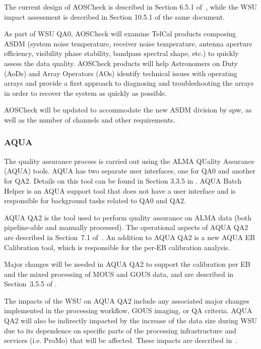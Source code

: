 The current design of AOSCheck is described in Section 6.5.1 of~\cite{CSA-IA}, while the WSU impact assessment is described in Section 10.5.1 of the same document.

As part of WSU QA0, AOSCheck will examine TelCal products composing ASDM (system noise temperature, receiver noise temperature, antenna aperture efficiency, visibility phase stability, bandpass spectral shape, etc.) to quickly assess the data quality. AOSCheck products will help Astronomers on Duty (AoDs) and Array Operators (AOs) identify technical issues with operating arrays and provide a first approach to diagnosing and troubleshooting the arrays in order to recover the system as quickly as possible.

AOSCheck will be updated to accommodate the new ASDM division by spw, as well as the number of channels and other requirements.

\subsubsection{AQUA}
\label{sec:aqua}
The quality assurance process is carried out using the ALMA QUality Assurance (AQUA) tools. AQUA has two separate user interfaces, one for QA0 and another for QA2. Details on this tool can be found in Section 3.3.5 in \cite{CSA-IA}. AQUA Batch Helper is an AQUA support tool that does not have a user interface and is responsible for background tasks related to QA0 and QA2.

AQUA QA2 is the tool used to perform quality assurance on ALMA data (both pipeline-able and manually processed). The operational aspects of AQUA QA2 are described in Section~7.1 of~\cite{dpda}. An addition to AQUA QA2 is a new AQUA EB Calibration tool, which is responsible for the per-EB calibration analysis.

Major changes will be needed in AQUA QA2 to support the calibration per EB and the mixed processing of MOUS and GOUS data, and are described in Section~3.5.5 of \cite{dp}.

The impacts of the WSU on AQUA QA2 include any associated major changes implemented in the processing workflow, GOUS imaging, or \ac{QA} criteria. AQUA QA2 will also be indirectly impacted by the increase of the data size during WSU due to its dependence on specific parts of the processing infrastructure and services (i.e. ProMo) that will be affected. These impacts are described in~\cite{dp}.

